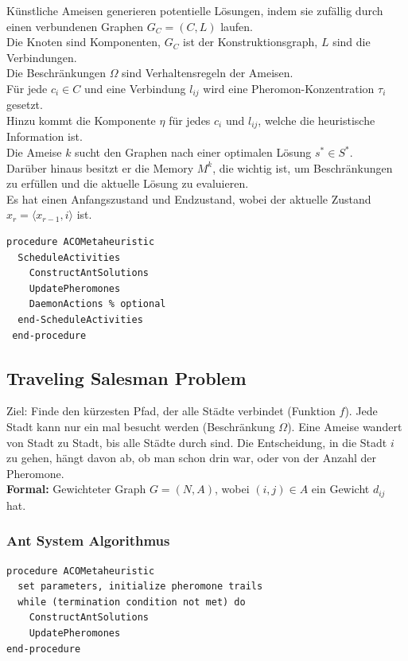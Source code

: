 \documentclass[a4paper]{article}
\begin{document}
Künstliche Ameisen generieren potentielle Lösungen, indem sie zufällig durch einen verbundenen Graphen $G_C=(C,L)$ laufen. \\
Die Knoten sind Komponenten, $G_C$ ist der Konstruktionsgraph, $L$ sind die Verbindungen.\\
Die Beschränkungen $\Omega$ sind Verhaltensregeln der Ameisen.\\
Für jede $c_i\in C$ und eine Verbindung $l_{ij}$ wird eine Pheromon-Konzentration $\tau_i$ gesetzt.\\
Hinzu kommt die Komponente $\eta$ für jedes $c_i$ und $l_{ij}$, welche die heuristische Information ist.\\
Die Ameise $k$ sucht den Graphen nach einer optimalen Lösung $s^*\in S^*$. \\
Darüber hinaus besitzt er die Memory $M^k$, die wichtig ist, um Beschränkungen zu erfüllen und die aktuelle Lösung zu evaluieren.\\
Es hat einen Anfangszustand und Endzustand, wobei der aktuelle Zustand $x_r=\langle x_{r-1},i \rangle$ ist.
\begin{lstlisting}
procedure ACOMetaheuristic
  ScheduleActivities
    ConstructAntSolutions
    UpdatePheromones
    DaemonActions % optional
  end-ScheduleActivities
 end-procedure
\end{lstlisting}
 
\subsection{Traveling Salesman Problem}
Ziel: Finde den kürzesten Pfad, der alle Städte verbindet (Funktion $f$). Jede Stadt kann nur ein mal besucht werden (Beschränkung $\Omega$). Eine Ameise wandert von Stadt zu Stadt, bis alle Städte durch sind. Die Entscheidung, in die Stadt $i$ zu gehen, hängt davon ab, ob man schon drin war, oder von der Anzahl der Pheromone.\\
\textbf{Formal:} Gewichteter Graph $G=(N,A)$, wobei $(i,j)\in A$ ein Gewicht $d_{ij}$ hat.
\subsubsection{Ant System Algorithmus}
\begin{lstlisting}
procedure ACOMetaheuristic
  set parameters, initialize pheromone trails
  while (termination condition not met) do
	ConstructAntSolutions
	UpdatePheromones  
end-procedure
\end{lstlisting}
\newpage
\end{document}

